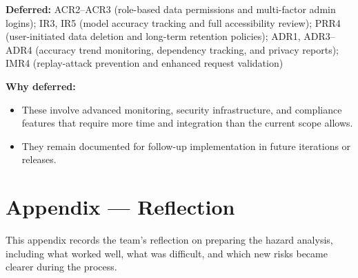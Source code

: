\documentclass{article}
\begin{document}
\noindent \textbf{Deferred:} ACR2--ACR3 (role-based data permissions and multi-factor admin logins); IR3, IR5 (model accuracy tracking and full accessibility review); PRR4 (user-initiated data deletion and long-term retention policies); ADR1, ADR3--ADR4 (accuracy trend monitoring, dependency tracking, and privacy reports); IMR4 (replay-attack prevention and enhanced request validation)

\vspace{2mm}
\noindent \textbf{Why deferred:}
\begin{itemize}
  \item These involve advanced monitoring, security infrastructure, and compliance features that require more time and integration than the current scope allows.
  \item They remain documented for follow-up implementation in future iterations or releases.
\end{itemize}

\newpage{}

\section*{Appendix --- Reflection}
This appendix records the team’s reflection on preparing the hazard analysis, including what worked well, what was difficult, and which new risks became clearer during the process.

% 
\end{document}
